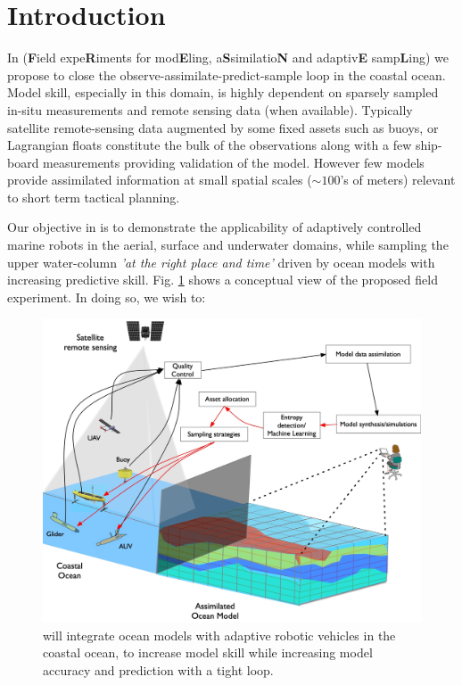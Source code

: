\section{Introduction}





In \proj (\textbf{F}ield expe\textbf{R}iments for mod\textbf{E}ling,
a\textbf{S}similatio\textbf{N} and adaptiv\textbf{E}
samp\textbf{L}ing) we propose to close the
observe-assimilate-predict-sample loop in the coastal ocean. Model
skill, especially in this domain, is highly dependent on sparsely
sampled in-situ measurements and remote sensing data (when
available). Typically satellite remote-sensing data augmented by some
fixed assets such as buoys, or Lagrangian floats constitute the bulk
of the observations along with a few ship-board measurements providing
validation of the model. However few models provide assimilated
information at small spatial scales ($\sim 100$'s of meters) relevant
to short term tactical planning.

Our objective in \proj is to demonstrate the applicability of
adaptively controlled marine robots in the aerial, surface and
underwater domains, while sampling the upper water-column \emph{'at
  the right place and time'} driven by ocean models with increasing
predictive skill. Fig. \ref{fig:block-diag} shows a conceptual view of
the proposed field experiment. In doing so, we wish to:

\begin{figure}[!b]
  \centering
  \includegraphics[scale=0.15]{fig/ensemble.jpg}
  \caption{\proj will integrate ocean models with adaptive robotic vehicles
    in the coastal ocean, to increase model skill while increasing
    model accuracy and prediction with a tight loop.}
  \label{fig:block-diag}
\end{figure}

